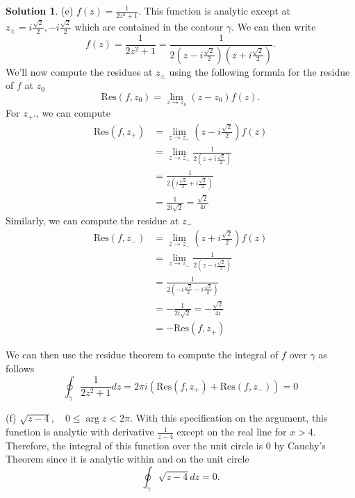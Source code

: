 \documentclass[12pt]{article}
\newcommand{\Res}{\text{Res}}
\theoremstyle{definition}
\newtheorem{sol}{Solution}
\theoremstyle{remark}
\begin{document}
\begin{sol}
    (e) $f(z) = \frac{1}{2z^2+1}$. This function is analytic except at $z_{\pm} = i\frac{\sqrt{2}}{2}, - i\frac{\sqrt{2}}{2}$ which are contained in the contour $\gamma$. We can then write 
    \begin{equation}
        f(z) = \frac{1}{2z^2 + 1} = \frac{1}{2(z - i\frac{\sqrt{2}}{2})(z + i\frac{\sqrt{2}}{2})}.
    \end{equation}
    We'll now compute the residues at $z_{\pm}$ using the following formula for the residue of $f$ at $z_0$ 
    \begin{equation}
        \Res(f, z_0) = \lim\limits_{z\to z_0} (z-z_0)f(z).
    \end{equation}
    For $z_{+}$., we can compute
    \begin{align}
        \Res(f,z_{+}) &= \lim\limits_{z\to z_+} \left(z - i\frac{\sqrt{2}}{2} \right)f(z)\\ 
                      &= \lim\limits_{z\to z_+} \frac{1}{2(z + i\frac{\sqrt{2}}{2})} \\
                      &= \frac{1}{2 \left(i\frac{\sqrt{2}}{2} + i\frac{\sqrt{2}}{2} \right)}\\
                      &= \frac{1}{2i\sqrt{2}} = \frac{\sqrt{2}}{4i}
    \end{align}
    Similarly, we can compute the residue at $z_{-}$
    \begin{align}
        \Res(f,z_{-}) &= \lim\limits_{z\to z_-} \left(z + i\frac{\sqrt{2}}{2} \right)f(z)\\ 
                      &= \lim\limits_{z\to z_-} \frac{1}{2(z - i\frac{\sqrt{2}}{2})} \\
                      &= \frac{1}{2 \left(-i\frac{\sqrt{2}}{2} - i\frac{\sqrt{2}}{2} \right)}\\
                      &= -\frac{1}{2i\sqrt{2}} = -\frac{\sqrt{2}}{4i}\\
                      &=  -\Res(f,z_{+}) 
    \end{align}

    We can then use the residue theorem to compute the integral of $f$ over $\gamma$ as follows
    \begin{equation}
        \oint_\gamma \frac{1}{2z^2+1} dz = 2\pi i \left(  \Res(f,z_{+}) +   \Res(f,z_{-})    \right) = 0
    \end{equation}

    (f) $\sqrt{z-4},\quad 0\leq\arg z<2\pi.$ With this specification on the argument, this function is analytic with derivative $\frac{1}{z-4}$ except on the real line for $x>4$. Therefore, the integral of this function over the unit circle is 0 by Cauchy's Theorem since it is analytic within and on the unit circle
    \begin{equation}
        \oint_{\gamma} \sqrt{z-4}dz = 0.
    \end{equation}
\end{sol}
\end{document}
